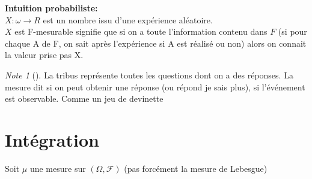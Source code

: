 \documentclass{article}
\theoremstyle{plain}%
\theoremstyle{definition}
\theoremstyle{remark}
\newtheorem*{note}{Note}
\begin{document}
\textbf{Intuition probabiliste:} \\
$X: \omega \to R $ est un nombre issu d'une expérience aléatoire. \\
$ X $ est F-mesurable signifie que si on a toute l'information contenu dans $ F $ (si pour chaque A de F, on sait après l'expérience si A est réalisé ou non) alors on connait la valeur prise pas X. 
\begin{note}[]
    La tribus représente toutes les questions dont on a des réponses. La mesure dit si on peut obtenir une réponse (ou répond je sais plus), si l'événement est observable. 
    Comme un jeu de devinette 
\end{note}


\section{Intégration}
Soit $ \mu  $ une mesure sur $ (\Omega , \mathcal{F}) $ (pas forcément la mesure de Lebesgue)
\end{document}
